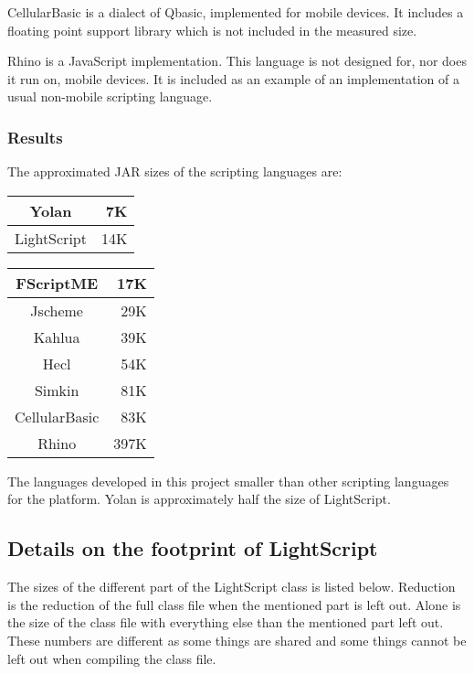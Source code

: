 \documentclass[11pt]{report}
\begin{document}
CellularBasic\cite{cellularbasic} is a dialect of Qbasic, implemented for mobile devices. 
It includes a floating point support library which is not included in the measured size. 

Rhino\cite{rhino} is a JavaScript implementation. This language is not designed for, nor does it run on, mobile devices. It is included as an example of an implementation of a usual non-mobile scripting language.

\subsubsection{Results}
The approximated JAR sizes of the scripting languages are:
\begin{center}
\begin{tabular}{|c|r|} \hline 
Yolan & 7K \\ \hline 
LightScript & 14K \\ \hline 
\end{tabular}
\begin{tabular}{|c|r|} \hline 
FScriptME & 17K \\ \hline 
Jscheme & 29K \\ \hline 
Kahlua & 39K \\ \hline 
Hecl & 54K \\ \hline 
Simkin & 81K \\ \hline 
CellularBasic & 83K \\ \hline 
Rhino & 397K \\ \hline 
\end{tabular}
\end{center}

The languages developed in this project smaller than other scripting languages for the platform. 
Yolan is approximately half the size of LightScript. 

\subsection{Details on the footprint of LightScript}
The sizes of the different part of the LightScript class is listed below.
Reduction is the reduction of the full class file when the mentioned part is left out. Alone is the size of the class file with everything else than the mentioned part left out. These numbers are different as some things are shared and some things cannot be left out when compiling the class file.
\end{document}
